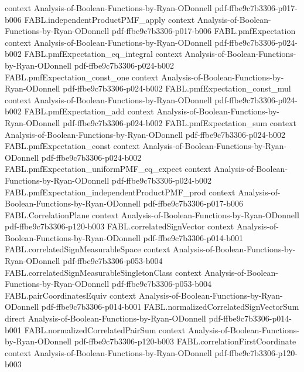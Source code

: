 \begin{theorem}
  {context}
  {Analysis-of-Boolean-Functions-by-Ryan-ODonnell}
  {pdf-ffbe9c7b3306-p017-b006}
\proofstep
  {FABL.independentProductPMF_apply}
  {context}
  {Analysis-of-Boolean-Functions-by-Ryan-ODonnell}
  {pdf-ffbe9c7b3306-p017-b006}
\proofstep
  {FABL.pmfExpectation}
  {context}
  {Analysis-of-Boolean-Functions-by-Ryan-ODonnell}
  {pdf-ffbe9c7b3306-p024-b002}
\proofstep
  {FABL.pmfExpectation_eq_integral}
  {context}
  {Analysis-of-Boolean-Functions-by-Ryan-ODonnell}
  {pdf-ffbe9c7b3306-p024-b002}
\proofstep
  {FABL.pmfExpectation_const_one}
  {context}
  {Analysis-of-Boolean-Functions-by-Ryan-ODonnell}
  {pdf-ffbe9c7b3306-p024-b002}
\proofstep
  {FABL.pmfExpectation_const_mul}
  {context}
  {Analysis-of-Boolean-Functions-by-Ryan-ODonnell}
  {pdf-ffbe9c7b3306-p024-b002}
\proofstep
  {FABL.pmfExpectation_add}
  {context}
  {Analysis-of-Boolean-Functions-by-Ryan-ODonnell}
  {pdf-ffbe9c7b3306-p024-b002}
\proofstep
  {FABL.pmfExpectation_sum}
  {context}
  {Analysis-of-Boolean-Functions-by-Ryan-ODonnell}
  {pdf-ffbe9c7b3306-p024-b002}
\proofstep
  {FABL.pmfExpectation_const}
  {context}
  {Analysis-of-Boolean-Functions-by-Ryan-ODonnell}
  {pdf-ffbe9c7b3306-p024-b002}
\proofstep
  {FABL.pmfExpectation_uniformPMF_eq_expect}
  {context}
  {Analysis-of-Boolean-Functions-by-Ryan-ODonnell}
  {pdf-ffbe9c7b3306-p024-b002}
\proofstep
  {FABL.pmfExpectation_independentProductPMF_prod}
  {context}
  {Analysis-of-Boolean-Functions-by-Ryan-ODonnell}
  {pdf-ffbe9c7b3306-p017-b006}
\proofstep
  {FABL.CorrelationPlane}
  {context}
  {Analysis-of-Boolean-Functions-by-Ryan-ODonnell}
  {pdf-ffbe9c7b3306-p120-b003}
\proofstep
  {FABL.correlatedSignVector}
  {context}
  {Analysis-of-Boolean-Functions-by-Ryan-ODonnell}
  {pdf-ffbe9c7b3306-p014-b001}
\proofstep
  {FABL.correlatedSignMeasurableSpace}
  {context}
  {Analysis-of-Boolean-Functions-by-Ryan-ODonnell}
  {pdf-ffbe9c7b3306-p053-b004}
\proofstep
  {FABL.correlatedSignMeasurableSingletonClass}
  {context}
  {Analysis-of-Boolean-Functions-by-Ryan-ODonnell}
  {pdf-ffbe9c7b3306-p053-b004}
\proofstep
  {FABL.pairCoordinatesEquiv}
  {context}
  {Analysis-of-Boolean-Functions-by-Ryan-ODonnell}
  {pdf-ffbe9c7b3306-p014-b001}
\proofstep
  {FABL.normalizedCorrelatedSignVectorSum}
  {direct}
  {Analysis-of-Boolean-Functions-by-Ryan-ODonnell}
  {pdf-ffbe9c7b3306-p014-b001}
\proofstep
  {FABL.normalizedCorrelatedPairSum}
  {context}
  {Analysis-of-Boolean-Functions-by-Ryan-ODonnell}
  {pdf-ffbe9c7b3306-p120-b003}
\proofstep
  {FABL.correlationFirstCoordinate}
  {context}
  {Analysis-of-Boolean-Functions-by-Ryan-ODonnell}
  {pdf-ffbe9c7b3306-p120-b003}

\end{theorem}
